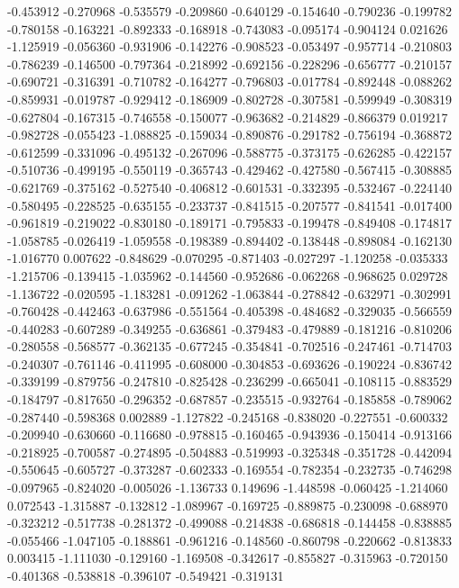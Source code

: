 -0.453912
-0.270968
-0.535579
-0.209860
-0.640129
-0.154640
-0.790236
-0.199782
-0.780158
-0.163221
-0.892333
-0.168918
-0.743083
-0.095174
-0.904124
0.021626
-1.125919
-0.056360
-0.931906
-0.142276
-0.908523
-0.053497
-0.957714
-0.210803
-0.786239
-0.146500
-0.797364
-0.218992
-0.692156
-0.228296
-0.656777
-0.210157
-0.690721
-0.316391
-0.710782
-0.164277
-0.796803
-0.017784
-0.892448
-0.088262
-0.859931
-0.019787
-0.929412
-0.186909
-0.802728
-0.307581
-0.599949
-0.308319
-0.627804
-0.167315
-0.746558
-0.150077
-0.963682
-0.214829
-0.866379
0.019217
-0.982728
-0.055423
-1.088825
-0.159034
-0.890876
-0.291782
-0.756194
-0.368872
-0.612599
-0.331096
-0.495132
-0.267096
-0.588775
-0.373175
-0.626285
-0.422157
-0.510736
-0.499195
-0.550119
-0.365743
-0.429462
-0.427580
-0.567415
-0.308885
-0.621769
-0.375162
-0.527540
-0.406812
-0.601531
-0.332395
-0.532467
-0.224140
-0.580495
-0.228525
-0.635155
-0.233737
-0.841515
-0.207577
-0.841541
-0.017400
-0.961819
-0.219022
-0.830180
-0.189171
-0.795833
-0.199478
-0.849408
-0.174817
-1.058785
-0.026419
-1.059558
-0.198389
-0.894402
-0.138448
-0.898084
-0.162130
-1.016770
0.007622
-0.848629
-0.070295
-0.871403
-0.027297
-1.120258
-0.035333
-1.215706
-0.139415
-1.035962
-0.144560
-0.952686
-0.062268
-0.968625
0.029728
-1.136722
-0.020595
-1.183281
-0.091262
-1.063844
-0.278842
-0.632971
-0.302991
-0.760428
-0.442463
-0.637986
-0.551564
-0.405398
-0.484682
-0.329035
-0.566559
-0.440283
-0.607289
-0.349255
-0.636861
-0.379483
-0.479889
-0.181216
-0.810206
-0.280558
-0.568577
-0.362135
-0.677245
-0.354841
-0.702516
-0.247461
-0.714703
-0.240307
-0.761146
-0.411995
-0.608000
-0.304853
-0.693626
-0.190224
-0.836742
-0.339199
-0.879756
-0.247810
-0.825428
-0.236299
-0.665041
-0.108115
-0.883529
-0.184797
-0.817650
-0.296352
-0.687857
-0.235515
-0.932764
-0.185858
-0.789062
-0.287440
-0.598368
0.002889
-1.127822
-0.245168
-0.838020
-0.227551
-0.600332
-0.209940
-0.630660
-0.116680
-0.978815
-0.160465
-0.943936
-0.150414
-0.913166
-0.218925
-0.700587
-0.274895
-0.504883
-0.519993
-0.325348
-0.351728
-0.442094
-0.550645
-0.605727
-0.373287
-0.602333
-0.169554
-0.782354
-0.232735
-0.746298
-0.097965
-0.824020
-0.005026
-1.136733
0.149696
-1.448598
-0.060425
-1.214060
0.072543
-1.315887
-0.132812
-1.089967
-0.169725
-0.889875
-0.230098
-0.688970
-0.323212
-0.517738
-0.281372
-0.499088
-0.214838
-0.686818
-0.144458
-0.838885
-0.055466
-1.047105
-0.188861
-0.961216
-0.148560
-0.860798
-0.220662
-0.813833
0.003415
-1.111030
-0.129160
-1.169508
-0.342617
-0.855827
-0.315963
-0.720150
-0.401368
-0.538818
-0.396107
-0.549421
-0.319131
